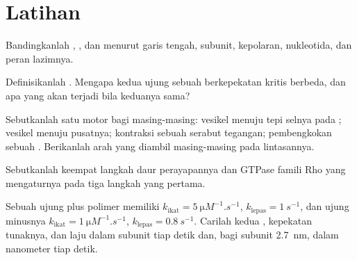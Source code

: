 \section{Latihan}

\begin{exercise}[$\star$]\label{exo:b3:cytoskeleton-motility:1}
Bandingkanlah , , dan  menurut
garis tengah, subunit, kepolaran, nukleotida, dan peran lazimnya.
\end{exercise}

\begin{exercise}[$\star$]\label{exo:b3:cytoskeleton-motility:2}
Definisikanlah . Mengapa kedua ujung sebuah 
berkepekatan kritis berbeda, dan apa yang akan terjadi
bila keduanya sama?
\end{exercise}

\begin{exercise}[$\star$]\label{exo:b3:cytoskeleton-motility:3}
Sebutkanlah satu motor bagi masing-masing: vesikel menuju tepi selnya pada
; vesikel menuju pusatnya; kontraksi sebuah serabut
tegangan; pembengkokan sebuah . Berikanlah arah yang diambil
masing-masing pada lintasannya.
\end{exercise}

\begin{exercise}[$\star$]\label{exo:b3:cytoskeleton-motility:4}
Sebutkanlah keempat langkah daur perayapannya dan GTPase famili Rho
yang mengaturnya pada tiga langkah yang pertama.
\end{exercise}

\begin{exercise}[$\star\star$]\label{exo:b3:cytoskeleton-motility:5}
Sebuah ujung plus polimer memiliki $k_{\text{ikat}} = \qty{5}{\micro M^{-1}.s^{-1}}$,
$k_{\text{lepas}} = \qty{1}{s^{-1}}$, dan ujung minusnya $k_{\text{ikat}} =
\qty{1}{\micro M^{-1}.s^{-1}}$, $k_{\text{lepas}} = \qty{0.8}{s^{-1}}$.
Carilah kedua , kepekatan tunaknya,
dan laju  dalam subunit tiap detik dan, bagi
subunit \qty{2.7}{nm}, dalam nanometer tiap detik.
\end{exercise}


